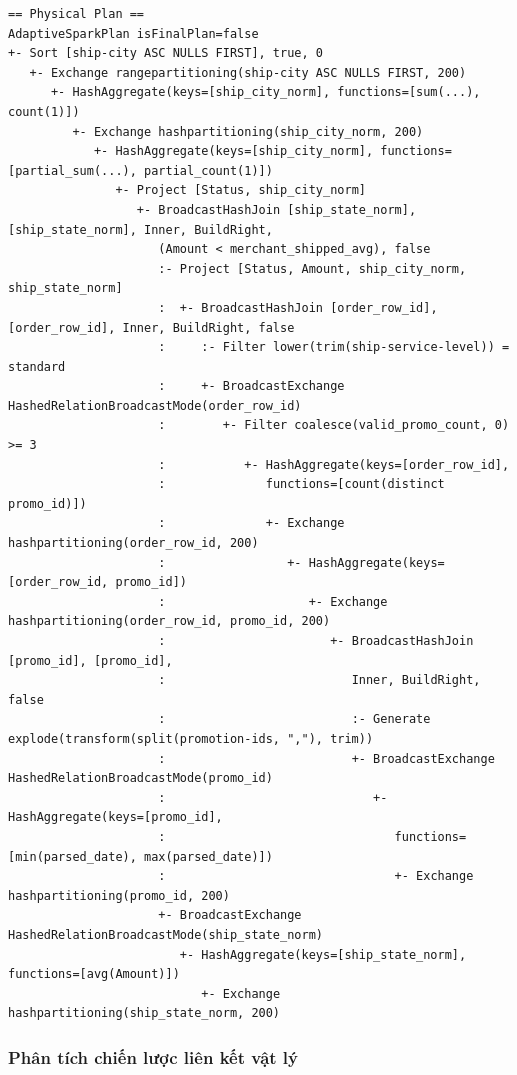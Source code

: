\begin{lstlisting}[language={},basicstyle=\ttfamily\tiny]
== Physical Plan ==
AdaptiveSparkPlan isFinalPlan=false
+- Sort [ship-city ASC NULLS FIRST], true, 0
   +- Exchange rangepartitioning(ship-city ASC NULLS FIRST, 200)
      +- HashAggregate(keys=[ship_city_norm], functions=[sum(...), count(1)])
         +- Exchange hashpartitioning(ship_city_norm, 200)
            +- HashAggregate(keys=[ship_city_norm], functions=[partial_sum(...), partial_count(1)])
               +- Project [Status, ship_city_norm]
                  +- BroadcastHashJoin [ship_state_norm], [ship_state_norm], Inner, BuildRight,
                     (Amount < merchant_shipped_avg), false
                     :- Project [Status, Amount, ship_city_norm, ship_state_norm]
                     :  +- BroadcastHashJoin [order_row_id], [order_row_id], Inner, BuildRight, false
                     :     :- Filter lower(trim(ship-service-level)) = standard
                     :     +- BroadcastExchange HashedRelationBroadcastMode(order_row_id)
                     :        +- Filter coalesce(valid_promo_count, 0) >= 3
                     :           +- HashAggregate(keys=[order_row_id],
                     :              functions=[count(distinct promo_id)])
                     :              +- Exchange hashpartitioning(order_row_id, 200)
                     :                 +- HashAggregate(keys=[order_row_id, promo_id])
                     :                    +- Exchange hashpartitioning(order_row_id, promo_id, 200)
                     :                       +- BroadcastHashJoin [promo_id], [promo_id],
                     :                          Inner, BuildRight, false
                     :                          :- Generate explode(transform(split(promotion-ids, ","), trim))
                     :                          +- BroadcastExchange HashedRelationBroadcastMode(promo_id)
                     :                             +- HashAggregate(keys=[promo_id],
                     :                                functions=[min(parsed_date), max(parsed_date)])
                     :                                +- Exchange hashpartitioning(promo_id, 200)
                     +- BroadcastExchange HashedRelationBroadcastMode(ship_state_norm)
                        +- HashAggregate(keys=[ship_state_norm], functions=[avg(Amount)])
                           +- Exchange hashpartitioning(ship_state_norm, 200)
\end{lstlisting}

\subsubsection{Phân tích chiến lược liên kết vật lý}

